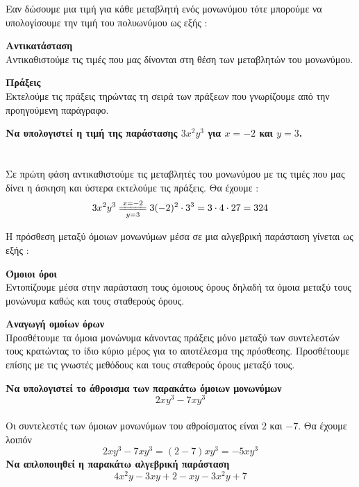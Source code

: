 \documentclass[twoside,nofonts,internet,methodoi]{thewria}
\newcommand{\eqq}[2]{\xlongequal[#2]{#1}}
\begin{document}
\begin{Methodos}
Εαν δώσουμε μια τιμή για κάθε μεταβλητή ενός μονωνύμου τότε μπορούμε να υπολογίσουμε την τιμή του πολυωνύμου ως εξής :
\begin{bhma}
\item \textbf{Αντικατάσταση}\\
Αντικαθιστούμε τις τιμές που μας δίνονται στη θέση των μεταβλητών του μονωνύμου.
\item \textbf{Πράξεις}\\
Εκτελούμε τις πράξεις τηρώντας τη σειρά των πράξεων που γνωρίζουμε από την προηγούμενη παράγραφο.
\end{bhma}
\end{Methodos}
\textbf{Να υπολογιστεί η τιμή της παράστασης {\boldmath $ 3x^2y^3 $} για {\boldmath $ x=-2 $} και {\boldmath $ y=3 $}.}\\\\
\lysh\\
Σε πρώτη φάση αντικαθιστούμε τις μεταβλητές του μονωνύμου με τις τιμές που μας δίνει η άσκηση και ύστερα εκτελούμε τις πράξεις. Θα έχουμε :
\[ 3x^2y^3\eqq{x=-2}{y=3}3(-2)^2\cdot3^3=3\cdot4\cdot27=324 \]
\begin{Methodos}
Η πρόσθεση μεταξύ όμοιων μονωνύμων μέσα σε μια αλγεβρική παράσταση γίνεται ως εξής :
\begin{bhma}
\item \textbf{Όμοιοι όροι}\\
Εντοπίζουμε μέσα στην παράσταση τους όμοιους όρους δηλαδή τα όμοια μεταξύ τους μονώνυμα καθώς και τους σταθερούς όρους.
\item \textbf{Αναγωγή ομοίων όρων}\\
Προσθέτουμε τα όμοια μονώνυμα κάνοντας πράξεις μόνο μεταξύ των συντελεστών τους κρατώντας το ίδιο κύριο μέρος για το αποτέλεσμα της πρόσθεσης. Προσθέτουμε επίσης με τις γνωστές μεθόδους και τους σταθερούς όρους μεταξύ τους.
\end{bhma}
\end{Methodos}
\textbf{Να υπολογιστεί το άθροισμα των παρακάτω όμοιων μονωνύμων}
{\boldmath \[ 2xy^3-7xy^3 \]}
\lysh\\
Οι συντελεστές των όμοιων μονωνύμων του αθροίσματος είναι $ 2 $ και $ -7 $. Θα έχουμε λοιπόν
\[ 2xy^3-7xy^3=(2-7)xy^3=-5xy^3 \]
\textbf{Να απλοποιηθεί η παρακάτω αλγεβρική παράσταση}
{\boldmath \[ 4x^2y-3xy+2-xy-3x^2y+7 \]}
\end{document}
